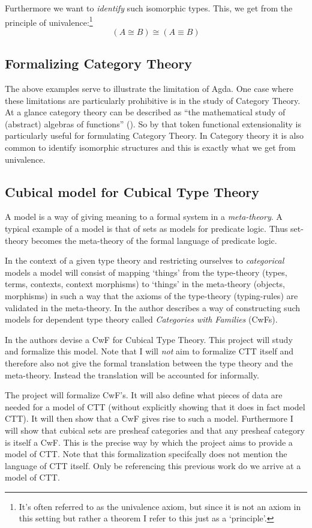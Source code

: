 \documentclass{article}
\begin{document}
Furthermore we want to \emph{identify} such isomorphic types. This, we get from
the principle of univalence:\footnote{It's often referred to as the univalence
axiom, but since it is not an axiom in this setting but rather a theorem I
refer to this just as a `principle'.}
%
$$(A \cong B) \cong (A \equiv B)$$
%
\subsection{Formalizing Category Theory}
%
The above examples serve to illustrate the limitation of Agda. One case where
these limitations are particularly prohibitive is in the study of Category
Theory. At a glance category theory can be described as ``the mathematical study
of (abstract) algebras of functions'' (\cite{awodey-2006}). So by that token
functional extensionality is particularly useful for formulating Category
Theory. In Category theory it is also common to identify isomorphic structures
and this is exactly what we get from univalence.

\subsection{Cubical model for Cubical Type Theory}
%
A model is a way of giving meaning to a formal system in a \emph{meta-theory}. A
typical example of a model is that of sets as models for predicate logic. Thus
set-theory becomes the meta-theory of the formal language of predicate logic.

In the context of a given type theory and restricting ourselves to
\emph{categorical} models a model will consist of mapping `things' from the
type-theory (types, terms, contexts, context morphisms) to `things' in the
meta-theory (objects, morphisms) in such a way that the axioms of the
type-theory (typing-rules) are validated in the meta-theory. In
\cite{dybjer-1995} the author describes a way of constructing such models for
dependent type theory called \emph{Categories with Families} (CwFs).

In \cite{bezem-2014} the authors devise a CwF for Cubical Type Theory. This
project will study and formalize this model. Note that I will \emph{not} aim to
formalize CTT itself and therefore also not give the formal translation between
the type theory and the meta-theory. Instead the translation will be accounted
for informally.

The project will formalize CwF's. It will also define what pieces of data are
needed for a model of CTT (without explicitly showing that it does in fact model
CTT). It will then show that a CwF gives rise to such a model. Furthermore I
will show that cubical sets are presheaf categories and that any presheaf
category is itself a CwF. This is the precise way by which the project aims to
provide a model of CTT. Note that this formalization specifcally does not
mention the language of CTT itself. Only be referencing this previous work do we
arrive at a model of CTT.
%
\end{document}
